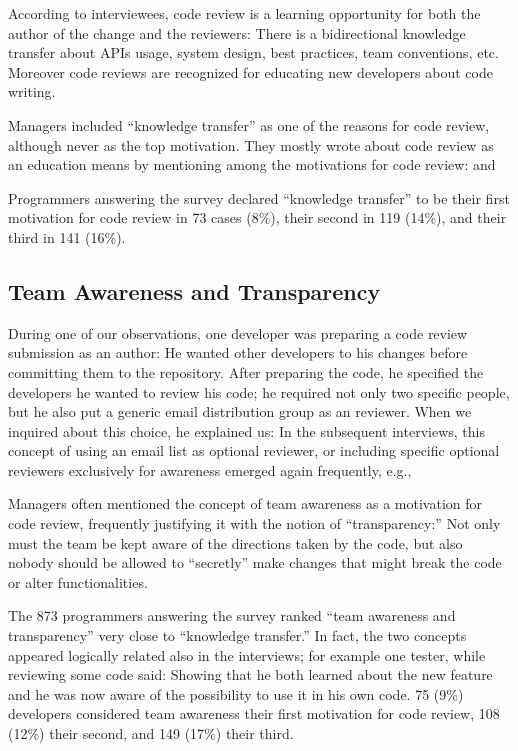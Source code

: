 According to interviewees, code review is a learning opportunity for both the
author of the change and the reviewers: There is a bidirectional knowledge
transfer about APIs usage, system design, best practices, team conventions,
 etc. Moreover code reviews are recognized
for educating new developers about code writing.

Managers included ``knowledge transfer'' as one of the reasons for code review,
although never as the top motivation. They mostly wrote about code review as an
education means by mentioning among the motivations for code review:
  and 

Programmers answering the survey declared ``knowledge transfer'' to be their
first motivation for code review in 73 cases (8\%), their second in 119 (14\%),
and their third in 141 (16\%).

\subsection{Team Awareness and Transparency}

During one of our observations, one developer was preparing a code review
submission as an author: He wanted other developers to 
his changes before committing them to the repository. After preparing the code,
he specified the developers he wanted to review his code; he required not only
two specific people, but he also put a generic email distribution group as an
 reviewer. When we inquired about this choice, he explained
us:  In the subsequent
interviews, this concept of using an email list as optional reviewer, or
including specific optional reviewers exclusively for awareness emerged again
frequently, e.g., 

Managers often mentioned the concept of team awareness as a motivation for code
review, frequently justifying it with the notion of ``transparency:'' Not only
must the team be kept aware of the directions taken by the code, but also
nobody should be allowed to ``secretly'' make changes that might break the code
or alter functionalities.

The 873 programmers answering the survey ranked ``team awareness and
transparency'' very close to ``knowledge transfer.'' In fact, the two concepts
appeared logically related also in the interviews; for example one tester,
while reviewing some code said:  Showing that he both
learned about the new feature and he was now aware of the possibility to use it
in his own code. 75 (9\%) developers considered team awareness their first
motivation for code review, 108 (12\%) their second, and 149 (17\%) their
third. 

